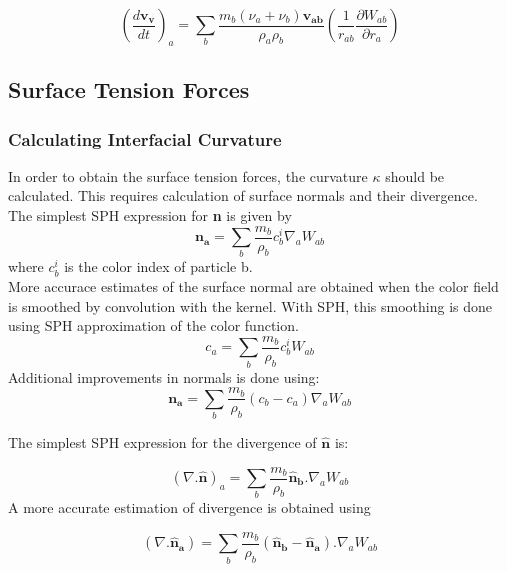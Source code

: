 \begin{equation}
 \left(\frac{d\mathbf{v_v}}{dt} \right)_a = \sum_b \frac{m_b(\nu_a + \nu_b)\mathbf{v_{ab}}}{\rho_a\rho_b} \left(\frac{1}{r_{ab}} \frac{\partial W_{ab}}{\partial r_a}\right) 
\end{equation}

\subsection{Surface Tension Forces}

\subsubsection{Calculating Interfacial Curvature}

In order to obtain the surface tension forces, the curvature $\kappa$ should be calculated. This requires calculation of surface normals and their divergence.\cite{Morris} \\

The simplest SPH expression for \textbf{n} is given by
\begin{equation}
 \mathbf{n_a} = \sum_b \frac{m_b}{\rho_b} c_b^i \nabla_a W_{ab}
\end{equation}
\noindent
where $c_b^i$ is the color index of particle b. \\
More accurace estimates of the surface normal are obtained when the color field is smoothed by convolution with the kernel. With SPH, this smoothing is done using SPH approximation of the color function.
\begin{equation}
 c_a = \sum_b \frac{m_b}{\rho_b}c_b^i W_{ab}
\end{equation}
\noindent
Additional improvements in normals is done using:
\begin{equation}
 \mathbf{n_a} = \sum_b \frac{m_b}{\rho_b} (c_b - c_a)\nabla_a W_{ab}
  \label{normal}
 \end{equation}

The simplest SPH expression for the divergence of $\mathbf{\hat n}$ is:

\begin{equation}
 \left( \nabla . \mathbf{\hat n}\right)_a = \sum_b \frac{m_b}{\rho_b} \mathbf{\hat n_b}.\nabla_a W_{ab}
\end{equation}
\noindent
A more accurate estimation of divergence is obtained using \cite{Monaghan1992}

\begin{equation}
 \left( \nabla . \mathbf{\hat n_a}\right) = \sum_b \frac{m_b}{\rho_b}(\mathbf{\hat n_b} - \mathbf{\hat n_a}). \nabla_a W_{ab} 
  \label{divergence}
 \end{equation}


